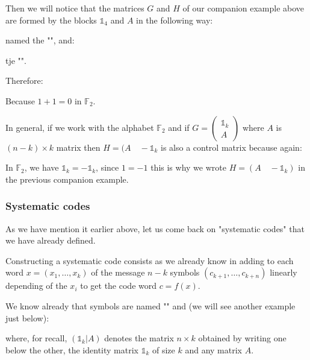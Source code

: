 	Then we will notice that the matrices $G$ and $H$ of our companion example above are formed by the blocks $\mathds{1}_4$ and $A$ in the following way:
	
	named the "", and:
	
	tje "".
	
	Therefore:
	
	Because $1 + 1 = 0$ in $\mathbb{F}_2$.

	In general, if we work with the alphabet $\mathbb{F}_2$ and if $G=\begin{pmatrix}\mathds{1}_k\\ A\end{pmatrix}$ where $A$ is $(n-k)\times k$ matrix then $H=(A\quad -\mathds{1}_k$ is also a control matrix because again:
	
	\begin{tcolorbox}[title=Remark,colframe=black,arc=10pt]
	In $\mathbb{F}_2$, we have $\mathds{1}_k=-\mathds{1}_k$, since $1=-1$ this is why we wrote $H=(A\quad -\mathds{1}_k)$ in the previous companion example.
	\end{tcolorbox}
	
	\subsubsection{Systematic codes}
	As we have mention it earlier above, let us come back on "systematic codes" that we have already defined.
	
	Constructing a systematic code consists as we already know in adding to each word $x=(x_1,\ldots,x_k)$ of the message $n-k$ symbols $(c_{k+1},\ldots,c_{k+n})$ linearly depending of the $x_i$ to get the code word $c=f(x)$.

	We know already that symbols are named "" and (we will see another example just below):
	
	where, for recall, $(\mathds{1}_k|A)$ denotes the matrix $n\times k$ obtained by writing one below the other, the identity matrix $\mathds{1}_k$ of size $k$ and any matrix $A$.
	
